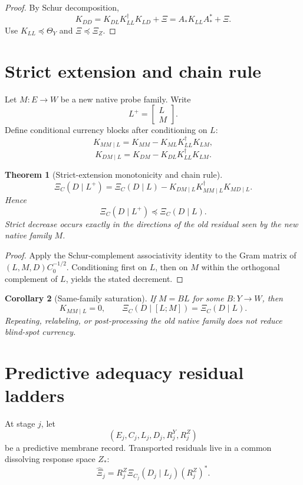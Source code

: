 \documentclass[11pt]{article}
\newtheorem{theorem}{Theorem}[section]
\newtheorem{corollary}[theorem]{Corollary}
\begin{document}
\begin{proof}
By Schur decomposition,
\[
K_{DD}=K_{DL}K_{LL}^{\dagger}K_{LD}+\Xi
=A_*K_{LL}A_*^*+\Xi.
\]
Use \(K_{LL}\preceq\Theta_Y\) and \(\Xi\preceq\Xi_Z\).
\end{proof}

\section{Strict extension and chain rule}
Let \(M:E\to W\) be a new native probe family.  Write
\[
L^+=\begin{bmatrix}L\\M\end{bmatrix}.
\]
Define conditional currency blocks after conditioning on \(L\):
\[
K_{MM\mid L}=K_{MM}-K_{ML}K_{LL}^{\dagger}K_{LM},
\]
\[
K_{DM\mid L}=K_{DM}-K_{DL}K_{LL}^{\dagger}K_{LM}.
\]

\begin{theorem}[Strict-extension monotonicity and chain rule]
\[
\boxed{
\Xi_C(D\mid L^+)
=
\Xi_C(D\mid L)-K_{DM\mid L}K_{MM\mid L}^{\dagger}K_{MD\mid L}.
}
\]
Hence
\[
\boxed{
\Xi_C(D\mid L^+)\preceq \Xi_C(D\mid L).
}
\]
Strict decrease occurs exactly in the directions of the old residual seen by the
new native family \(M\).
\end{theorem}

\begin{proof}
Apply the Schur-complement associativity identity to the Gram matrix of
\((L,M,D)C_0^{-1/2}\).  Conditioning first on \(L\), then on \(M\) within the
orthogonal complement of \(L\), yields the stated decrement.
\end{proof}

\begin{corollary}[Same-family saturation]
If \(M=B L\) for some \(B:Y\to W\), then
\[
K_{MM\mid L}=0,
\qquad
\Xi_C(D\mid [L;M])=\Xi_C(D\mid L).
\]
Repeating, relabeling, or post-processing the old native family does not reduce
blind-spot currency.
\end{corollary}

\section{Predictive adequacy residual ladders}
At stage \(j\), let
\[
(E_j,C_j,L_j,D_j,R^Y_j,R^Z_j)
\]
be a predictive membrane record.  Transported residuals live in a common
dissolving response space \(Z_\ast\):
\[
\widehat \Xi_j=R^Z_j\Xi_{C_j}(D_j\mid L_j)(R^Z_j)^*.
\]
\end{document}

